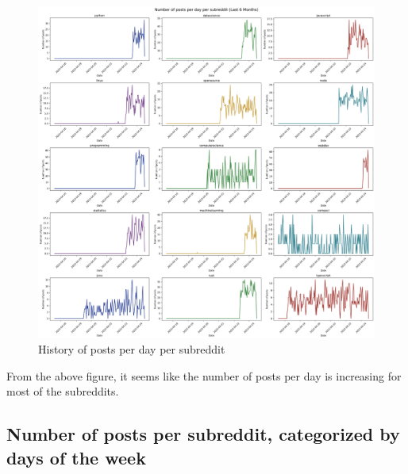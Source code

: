 \documentclass[12pt, letterpage]{article}
\begin{document}
\begin{figure}[H]
    \centering
    \includegraphics[width=1\textwidth]{num_posts_per_day_per_subreddit.png}
    \caption{History of posts per day per subreddit}
    \label{fig:history_posts_per_day}
\end{figure}

From the above figure, it seems like the number of posts per day is increasing for most of the subreddits.

\subsection*{Number of posts per subreddit, categorized by days of the week}
\end{document}
